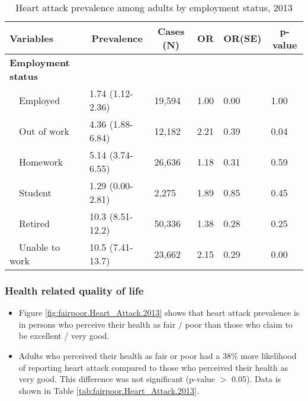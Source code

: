 \begin{table}[H]
\caption{Heart attack prevalence  among adults by employment status, 2013\label{tab:employ.Heart_Attack.2013}} 
\begin{center}
\begin{tabular}{llllll}
\hline\hline
\multicolumn{1}{l}{Variables}&\multicolumn{1}{c}{Prevalence}&\multicolumn{1}{c}{Cases (N)}&\multicolumn{1}{c}{OR}&\multicolumn{1}{c}{OR(SE)}&\multicolumn{1}{c}{p-value}\tabularnewline
\hline
{\bfseries Employment status}&&&&&\tabularnewline
~~Employed&1.74 (1.12-2.36)&19,594&1.00&0.00&1.00\tabularnewline
~~Out of work&4.36 (1.88-6.84)&12,182&2.21&0.39&0.04\tabularnewline
~~Homework&5.14 (3.74-6.55)&26,636&1.18&0.31&0.59\tabularnewline
~~Student&1.29 (0.00-2.81)& 2,275&1.89&0.85&0.45\tabularnewline
~~Retired&10.3 (8.51-12.2)&50,336&1.38&0.28&0.25\tabularnewline
~~Unable to work&10.5 (7.41-13.7)&23,662&2.15&0.29&0.00\tabularnewline
\hline
\end{tabular}\end{center}

\end{table}


 \newpage
\subsubsection{Health related quality of life}


 \begin{itemize}

\item Figure \ref{fig:fairpoor.Heart_Attack.2013} shows that heart attack prevalence is 
 in persons who perceive their health as fair / poor than those who claim to be excellent / very good.

\item Adults who perceived their health as fair or poor had a 38\% more likelihood of reporting heart attack compared to those who perceived their health as very good. This difference was not significant (p-value $>$ 0.05). Data is shown in Table \ref{tab:fairpoor.Heart_Attack.2013}.

\end{itemize}

